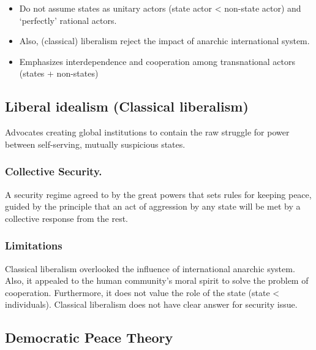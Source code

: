 \documentclass[
]{book}
\begin{document}
\begin{itemize}
\item
  Do not assume states as unitary actors (state actor \textless{} non-state actor) and `perfectly' rational actors.
\item
  Also, (classical) liberalism reject the impact of anarchic international system.
\item
  Emphasizes interdependence and cooperation among transnational actors (states + non-states)
\end{itemize}

\hypertarget{liberal-idealism-classical-liberalism}{%
\subsection{Liberal idealism (Classical liberalism)}\label{liberal-idealism-classical-liberalism}}

Advocates creating global institutions to contain the raw struggle for power between self-serving, mutually suspicious states.

\hypertarget{collective-security.}{%
\subsubsection{Collective Security.}\label{collective-security.}}

A security regime agreed to by the great powers that sets rules for keeping peace, guided by the principle that an act of aggression by any state will be met by a collective response from the rest.

\hypertarget{limitations}{%
\subsubsection{Limitations}\label{limitations}}

Classical liberalism overlooked the influence of international anarchic system. Also, it appealed to the human community's moral spirit to solve the problem of cooperation. Furthermore, it does not value the role of the state (state \textless{} individuals). Classical liberalism does not have clear answer for security issue.

\hypertarget{democratic-peace-theory}{%
\subsection{Democratic Peace Theory}\label{democratic-peace-theory}}
\end{document}
